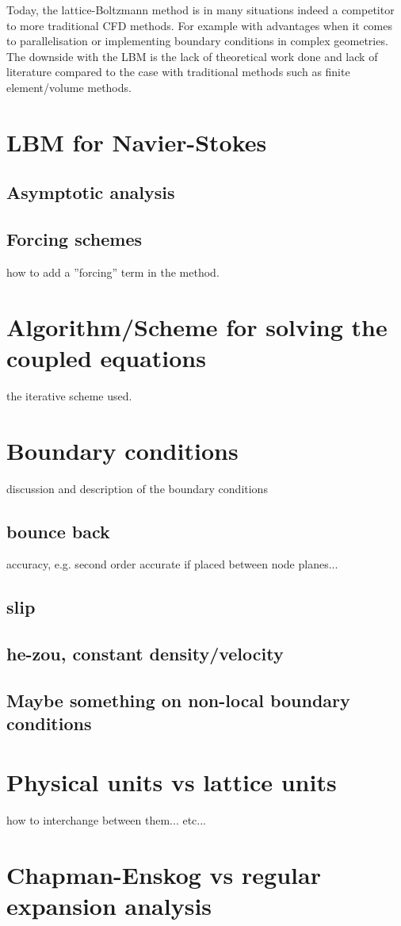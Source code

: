 Today, the lattice-Boltzmann method is in many situations indeed a
competitor to more traditional CFD methods. For example with
advantages when it comes to parallelisation or implementing boundary
conditions in complex geometries. The downside with the LBM is the
lack of theoretical work done and lack of literature compared to the
case with traditional methods such as finite element/volume
methods. \cite{junk-asym}













\section{LBM for Navier-Stokes}
\subsection{Asymptotic analysis}\label{sec:lbm:asym_ns}

\subsection{Forcing schemes}
how to add a ''forcing'' term in the method.



\section{Algorithm/Scheme for solving the coupled equations}
the iterative scheme used.

\section{Boundary conditions}\label{sec:lbm:bound}
discussion and description of the boundary conditions
\subsection{bounce back}
accuracy, e.g. second order accurate if placed between node planes...
\subsection{slip}
\subsection{he-zou, constant density/velocity}
\subsection{Maybe something on non-local boundary conditions}

\section{Physical units vs lattice units}
how to interchange between them... etc...

\section{Chapman-Enskog vs regular expansion analysis}
